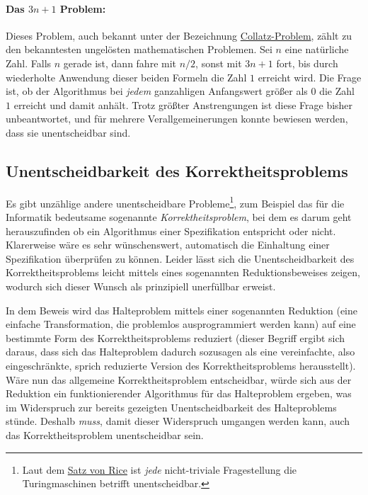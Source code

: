 \paragraph{Das $3n+1$ Problem:} Dieses Problem, auch bekannt unter der Bezeichnung \href{http://de.wikipedia.org/wiki/Collatz-Problem}{Collatz-Problem}, z\"{a}hlt zu den bekanntesten ungel\"{o}sten mathematischen Problemen. Sei $n$ eine nat\"{u}rliche Zahl. Falls $n$ gerade ist, dann fahre mit $n/2$, sonst mit $3n+1$ fort, bis durch wiederholte Anwendung dieser beiden Formeln die Zahl $1$ erreicht wird. Die Frage ist, ob der Algorithmus bei \emph{jedem} ganzahligen Anfangswert gr\"{o}{\ss}er als $0$ die Zahl $1$ erreicht und damit anh\"{a}lt. Trotz gr\"{o}{\ss}ter Anstrengungen ist diese Frage bisher unbeantwortet, und f\"{u}r mehrere Verallgemeinerungen konnte bewiesen werden, dass sie unentscheidbar sind.

\subsection{Unentscheidbarkeit des Korrektheitsproblems}
Es gibt unz\"{a}hlige andere unentscheidbare Probleme\footnote{Laut dem \href{http://de.wikipedia.org/wiki/Satz_von_Rice}{Satz von Rice} ist \emph{jede} nicht-triviale Fragestellung die Turingmaschinen betrifft unentscheidbar.}, zum Beispiel das f\"{u}r die Informatik bedeutsame sogenannte \emph{Korrektheitsproblem}, bei dem es darum geht herauszufinden ob ein Algorithmus einer Spezifikation entspricht oder nicht. Klarerweise w\"{a}re es sehr w\"{u}nschenswert, automatisch die Einhaltung einer Spezifikation \"{u}berpr\"{u}fen zu k\"{o}nnen. Leider l\"{a}sst sich die Unentscheidbarkeit des Korrektheitsproblems leicht mittels eines sogenannten Reduktionsbeweises zeigen, wodurch sich dieser Wunsch als prinzipiell unerf\"{u}llbar erweist.

In dem Beweis wird das Halteproblem mittels einer sogenannten Reduktion (eine einfache Transformation, die problemlos ausprogrammiert werden kann) auf eine bestimmte Form des Korrektheitsproblems reduziert (dieser Begriff ergibt sich daraus, dass sich das Halteproblem dadurch sozusagen als eine vereinfachte, also eingeschr\"{a}nkte, sprich reduzierte Version des Korrektheitsproblems herausstellt). W\"{a}re nun das allgemeine Korrektheitspro\-blem entscheid\-bar, w\"{u}rde sich aus der Reduktion ein funktionierender Algorithmus f\"{u}r das Halteproblem ergeben, was im Widerspruch zur bereits gezeigten Unentscheidbarkeit des Halteproblems st\"{u}nde. Deshalb \emph{muss}, damit dieser Widerspruch umgangen werden kann, auch das Korrekt\-heitsproblem unentscheidbar sein.

